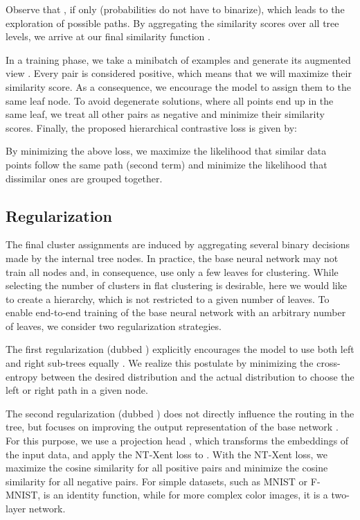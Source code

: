 \documentclass[runningheads]{llncs}
\begin{document}
Observe that , if only  (probabilities do not have to binarize), which leads to the exploration of possible paths. By aggregating the similarity scores over all tree levels, we arrive at our final similarity function . 







In a training phase, we take a minibatch  of  examples and generate its augmented view . Every pair  is considered positive, which means that we will maximize their similarity score. As a consequence, we encourage the model to assign them to the same leaf node. To avoid degenerate solutions, where all points end up in the same leaf, we treat all other pairs as negative and minimize their similarity scores. Finally, the proposed hierarchical contrastive loss is given by:

By minimizing the above loss, we maximize the likelihood that similar data points follow the same path (second term) and minimize the likelihood that dissimilar ones are grouped together.


\subsection{Regularization}





The final cluster assignments are induced by aggregating several binary decisions made by the internal tree nodes. In practice, the base neural network may not train all nodes and, in consequence, use only a few leaves for clustering. While selecting the number of clusters in flat clustering is desirable, here we would like to create a hierarchy, which is not restricted to a given number of leaves. To enable end-to-end training of the base neural network with an arbitrary number of leaves, we consider two regularization strategies. 

The first regularization (dubbed ) explicitly encourages the model to use both left and right sub-trees equally \cite{frosst2017distilling}. We realize this postulate by minimizing the cross-entropy between the desired distribution  and the actual distribution to choose the left or right path in a given node. 

The second regularization (dubbed ) does not directly influence the routing in the tree, but focuses on improving the output representation of the base network . For this purpose, we use a projection head , which transforms the embeddings  of the input data, and apply the NT-Xent loss \cite{simclr} to . With the NT-Xent loss, we maximize the cosine similarity for all positive pairs and minimize the cosine similarity for all negative pairs. For simple datasets, such as MNIST or F-MNIST,  is an identity function, while for more complex color images, it is a two-layer network.
\end{document}
